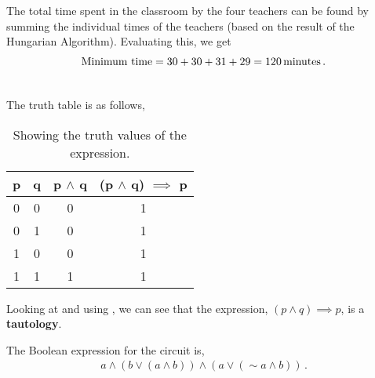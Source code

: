 \begin{subquestions}
\begin{subsubquestions}
\subsubquestion

The total time spent in the classroom by the four teachers can be found by summing the individual times of the teachers (based on the result of the Hungarian Algorithm). Evaluating this, we get
		\begin{align}
			\text{Minimum time} = 30+30+31+29 = 120 \, \text{minutes}\,. \\ \nonumber 
		\end{align}	
	\end{subsubquestions}
	
	
\subquestion
	
The truth table is as follows,
\begin{table}[ht]
		\centering
		\begin{tabular}{|c|c|c|c|}
			\hline
			p & q & p $\land$ q & (p $\land$ q) $\implies$ p \\
			\hline
			0 & 0 & 0 & 1 \\
			0 & 1 & 0 & 1 \\
			1 & 0 & 0 & 1 \\
			1 & 1 & 1 & 1 \\
			\hline
		\end{tabular}
		\caption{\label{2015:q2:tab:TrthTab} Showing the truth values of the expression.}
\end{table}        
	
Looking at  and using , we can see that the expression, $(p \land q) \implies p$, is a \textbf{tautology}.  \\
	
		
\subquestion
	
\begin{subsubquestions}
		
\subsubquestion
		
The Boolean expression for the circuit is,
		\begin{align}
			a \land (b \lor (a \land b)) \land (a \lor (\sim a \land b))\,.
		\end{align}	
		


\end{subsubquestions}
\end{subquestions}
